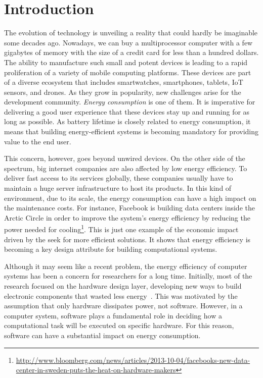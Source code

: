 \chapter{Introduction}\label{chp:introduction}


The evolution of technology is unveiling a reality that could hardly be imaginable some decades ago. Nowadays, we can buy a multiprocessor computer with a few gigabytes of memory with the size of a credit card for less than a hundred dollars. The ability to manufacture such small and potent devices is leading to a rapid proliferation of a variety of mobile computing platforms. These devices are part of a diverse ecosystem that includes smartwatches, smartphones, tablets, IoT sensors, and drones. As they grow in popularity, new challenges arise for the development community. \emph{Energy consumption} is one of them. It is imperative for delivering a good user experience that these devices stay up and running for as long as possible. As battery lifetime is closely related to energy consumption, it means that building energy-efficient systems is becoming mandatory for providing value to the end user.

This concern, however, goes beyond unwired devices. On the other side of the spectrum, big internet companies are also affected by low energy efficiency. To deliver fast access to its services globally, these companies usually have to maintain a huge server infrastructure to host its products. In this kind of environment, due to its scale, the energy consumption can have a high impact on the maintenance costs. For instance, Facebook is building data centers inside the Arctic Circle in order to improve the system's energy efficiency by reducing the power needed for cooling\footnote{\scriptsize\url{http://www.bloomberg.com/news/articles/2013-10-04/facebooks-new-data-center-in-sweden-puts-the-heat-on-hardware-makers}}. This is just one example of the economic impact driven by the seek for more efficient solutions. It shows that energy efficiency is becoming a key design attribute for building computational systems.

Although it may seem like a recent problem, the energy efficiency of computer systems has been a concern for researchers for a long time. Initially, most of the research focused on the hardware design layer, developing new ways to build electronic components that wasted less energy~\cite{chandrakasan:1992}. This was motivated by the assumption that only hardware dissipates power, not software. However, in a computer system, software plays a fundamental role in deciding how a computational task will be executed on specific hardware. For this reason, software can have a substantial impact on energy consumption.

